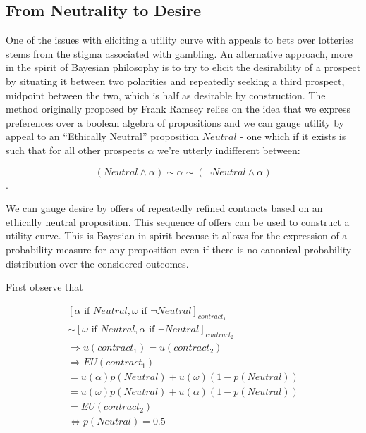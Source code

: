 \documentclass[
]{book}
\theoremstyle{definition}
\theoremstyle{definition}
\theoremstyle{definition}
\theoremstyle{remark}
\begin{document}
\hypertarget{from-neutrality-to-desire}{%
\subsection{From Neutrality to Desire}\label{from-neutrality-to-desire}}

One of the issues with eliciting a utility curve with appeals to bets over lotteries stems from the stigma associated with gambling. An alternative approach, more in the spirit of Bayesian philosophy is to try to elicit the desirability of a prospect by situating it between two polarities and repeatedly seeking a third prospect, midpoint between the two, which is half as desirable by construction. The method originally proposed by Frank Ramsey relies on the idea that we express preferences over a boolean algebra of propositions and we can gauge utility by appeal to an ``Ethically Neutral'' proposition \(Neutral\) - one which if it exists is such that for all other prospects \(\alpha\) we're utterly indifferent between:

\[(Neutral \wedge \alpha) \sim \alpha \sim (\neg Neutral \wedge \alpha)\].

We can gauge desire by offers of repeatedly refined contracts based on an ethically neutral proposition. This sequence of offers can be used to construct a utility curve. This is Bayesian in spirit because it allows for the expression of a probability measure for any proposition even if there is no canonical probability distribution over the considered outcomes.

\noindent First observe that

\begin{equation}
\begin{split}
[ \alpha \text{ if } Neutral, \omega \text{ if } \neg Neutral ]_{contract_{1}} \\  \sim [ \omega  \text{ if } Neutral, \alpha \text{ if } \neg Neutral ]_{contract_{2}} \\   \Rightarrow u(contract_{1})  = u(contract_{2})   \\  \Rightarrow EU(contract_{1}) \\ = u(\alpha)p(Neutral) + u(\omega)(1-p(Neutral)) \\ 
= u(\omega)p(Neutral) + u(\alpha)(1-p(Neutral)) \\ 
= EU(contract_{2})  
\\ \Leftrightarrow p(Neutral) = 0.5
\end{split}
\end{equation}
\end{document}
